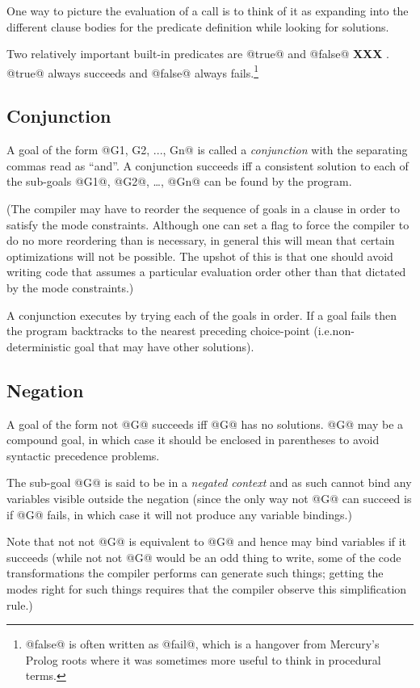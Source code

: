 \documentclass[a4paper,11pt,notitlepage,onecolumn]{article}
\makeatletter
\newcommand{\ie}%
{i.e.\@ }
\newcommand{\XXX}[1]%
{{\small\textbf{XXX} \emph{#1}}}
\makeatother
\begin{document}
One way to picture the evaluation of a call is to think of it
as expanding into the different clause bodies for the
predicate definition while looking for solutions.

Two relatively important built-in predicates are @true@ and
@false@ \XXX{}.  @true@ always succeeds and @false@ always fails.\footnote{@false@ is often written as @fail@, which is a hangover
from Mercury's Prolog roots where it was sometimes more useful
to think in procedural terms.}

\subsection{Conjunction}

A goal of the form @G1, G2, ..., Gn@ is called a \emph{conjunction}
with the separating commas read as ``and''.  A conjunction
succeeds iff a consistent solution to each of the sub-goals @G1@,
@G2@, \ldots, @Gn@ can be found by the program.

(The compiler may have to reorder the sequence of goals in a
clause in order to satisfy the mode constraints.  Although one
can set a flag to force the compiler to do no more reordering
than is necessary, in general this will mean that certain
optimizations will not be possible.  The upshot of this is
that one should avoid writing code that assumes a particular
evaluation order other than that dictated by the mode
constraints.)

A conjunction executes by trying each of the goals in order.
If a goal fails then the program backtracks to the nearest
preceding choice-point (\ie non-deterministic goal that may
have other solutions).

\subsection{Negation}

A goal of the form not @G@ succeeds iff @G@ has no solutions.  @G@
may be a compound goal, in which case it should be enclosed in
parentheses to avoid syntactic precedence problems.

The sub-goal @G@ is said to be in a \emph{negated context} and as
such cannot bind any variables visible outside the negation
(since the only way not @G@ can succeed is if @G@ fails, in which
case it will not produce any variable bindings.)

Note that not not @G@ is equivalent to @G@ and hence may bind
variables if it succeeds (while not not @G@ would be an odd
thing to write, some of the code transformations the compiler
performs can generate such things; getting the modes right for
such things requires that the compiler observe this
simplification rule.)
\end{document}
